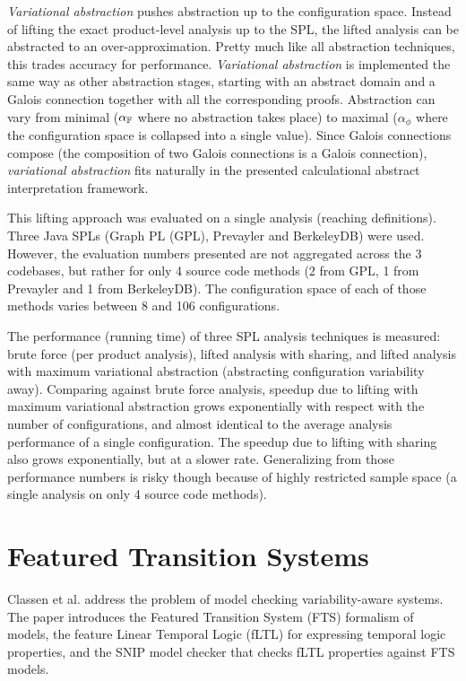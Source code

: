 \documentclass[11pt]{article}
\begin{document}
\emph{Variational abstraction} pushes abstraction up to the configuration space. Instead of lifting the exact product-level analysis up to the SPL, the lifted analysis can be abstracted to an over-approximation. Pretty much like all abstraction techniques, this trades accuracy for performance. \emph{Variational abstraction} is implemented the same way as other abstraction stages, starting with an abstract domain and a Galois connection together with all the corresponding proofs. Abstraction can vary from minimal ($\alpha_{\mathbb{F}}$ where no abstraction takes place) to maximal ($\alpha_\phi$ where the configuration space is collapsed into a single value). Since Galois connections compose (the composition of two Galois connections is a Galois connection), \emph{variational abstraction} fits naturally in the presented calculational abstract interpretation framework.

This lifting approach was evaluated on a single analysis (reaching definitions). Three Java SPLs (Graph PL (GPL), Prevayler and BerkeleyDB) were used. However, the evaluation numbers presented are not aggregated across the 3 codebases, but rather for only 4 source code methods (2 from GPL, 1 from Prevayler and 1 from BerkeleyDB). The configuration space of each of those methods varies between 8 and 106 configurations.

The performance (running time) of three SPL analysis techniques is measured: brute force (per product analysis), lifted analysis with sharing, and lifted analysis with maximum variational abstraction (abstracting configuration variability away). Comparing against brute force analysis, speedup due to lifting with maximum variational abstraction grows exponentially with respect with the number of configurations, and almost identical to the average analysis performance of a single configuration. The speedup due to lifting with sharing also grows exponentially, but at a slower rate. Generalizing from those performance numbers is risky though because of highly restricted sample space (a single analysis on only 4 source code methods).

\section{Featured Transition Systems}

Classen et al.\cite{Classen:2013} address the problem of model checking variability-aware systems. The paper introduces the Featured Transition System (FTS) formalism of models, the feature Linear Temporal Logic (fLTL) for expressing temporal logic properties, and the SNIP model checker that checks fLTL properties against FTS models.
\end{document}
